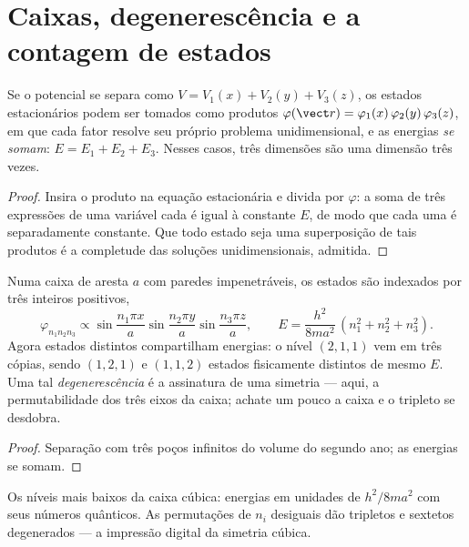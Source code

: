 \section{Caixas, degenerescência e a contagem de estados}

\begin{theorem}\label{thm:b3:schrodinger-three-dimensions:separation}
Se o potencial se separa como $V = V_1(x) + V_2(y) + V_3(z)$, os
estados estacionários podem ser tomados como produtos
$\varphi(\vect r) = \varphi_1(x)\,\varphi_2(y)\,\varphi_3(z)$, em que
cada fator resolve seu próprio problema unidimensional, e as energias
\emph{se somam}: $E = E_1 + E_2 + E_3$. Nesses casos, três dimensões
são uma dimensão três vezes.
\end{theorem}

\begin{proof}
Insira o produto na equação estacionária e divida por
$\varphi$: a soma de três expressões de uma variável cada é igual à
constante $E$, de modo que cada uma é separadamente constante. Que todo
estado seja uma superposição de tais produtos é a completude das
soluções unidimensionais, admitida.
\end{proof}

\begin{proposition}\label{prop:b3:schrodinger-three-dimensions:box}
Numa caixa de aresta $a$ com paredes impenetráveis, os estados são
indexados por três inteiros positivos,
\[
\varphi_{n_1n_2n_3} \propto
\sin\frac{n_1\pi x}{a}\sin\frac{n_2\pi y}{a}\sin\frac{n_3\pi z}{a} ,
\qquad
E = \frac{h^2}{8ma^2}\,(n_1^2 + n_2^2 + n_3^2) .
\]
Agora estados distintos compartilham energias: o nível $(2,1,1)$ vem em
três cópias, sendo $(1,2,1)$ e $(1,1,2)$ estados fisicamente distintos
de mesmo $E$. Uma tal \emph{degenerescência} é a assinatura de uma
simetria --- aqui, a permutabilidade dos três eixos da caixa; achate
um pouco a caixa e o tripleto se desdobra.
\end{proposition}

\begin{proof}
Separação com três poços infinitos do volume do segundo ano; as
energias se somam.
\end{proof}

\begin{omfigure}

{\small Os níveis mais baixos da caixa cúbica: energias em unidades de
$h^2/8ma^2$ com seus números quânticos. As permutações de $n_i$
desiguais dão tripletos e sextetos degenerados --- a impressão digital
da simetria cúbica.}
\end{omfigure}

